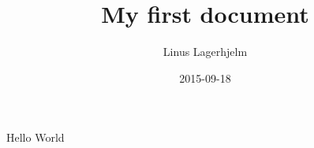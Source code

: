 \documentclass{article}
\title{My first document}
\date{2015-09-18}
\author{Linus Lagerhjelm}
\begin{document}
		
	
	Hello World
\end{document}
